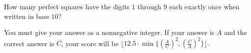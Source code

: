 How many perfect squares have the digits $1$ through $9$ each exactly once when written in base $10$?

You must give your answer as a nonnegative integer. If your answer is $A$ and the correct answer is $C$,  your score will be $\lfloor12.5\cdot\min\{(\tfrac{A}{C})^2,(\tfrac{C}{A})^2\}\rfloor.$
